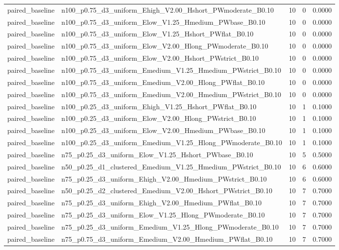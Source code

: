 \begin{tabular}{llrrr}
paired_baseline & n100_p0.75_d3_uniform_Ehigh_V2.00_Hshort_PWmoderate_B0.10 & 10 & 0 & 0.0000 \\
paired_baseline & n100_p0.75_d3_uniform_Elow_V1.25_Hmedium_PWbase_B0.10 & 10 & 0 & 0.0000 \\
paired_baseline & n100_p0.75_d3_uniform_Elow_V1.25_Hshort_PWflat_B0.10 & 10 & 0 & 0.0000 \\
paired_baseline & n100_p0.75_d3_uniform_Elow_V2.00_Hlong_PWmoderate_B0.10 & 10 & 0 & 0.0000 \\
paired_baseline & n100_p0.75_d3_uniform_Elow_V2.00_Hshort_PWstrict_B0.10 & 10 & 0 & 0.0000 \\
paired_baseline & n100_p0.75_d3_uniform_Emedium_V1.25_Hmedium_PWstrict_B0.10 & 10 & 0 & 0.0000 \\
paired_baseline & n100_p0.75_d3_uniform_Emedium_V2.00_Hlong_PWflat_B0.10 & 10 & 0 & 0.0000 \\
paired_baseline & n100_p0.75_d3_uniform_Emedium_V2.00_Hmedium_PWstrict_B0.10 & 10 & 0 & 0.0000 \\
paired_baseline & n100_p0.25_d3_uniform_Ehigh_V1.25_Hshort_PWflat_B0.10 & 10 & 1 & 0.1000 \\
paired_baseline & n100_p0.25_d3_uniform_Elow_V2.00_Hlong_PWstrict_B0.10 & 10 & 1 & 0.1000 \\
paired_baseline & n100_p0.25_d3_uniform_Elow_V2.00_Hmedium_PWbase_B0.10 & 10 & 1 & 0.1000 \\
paired_baseline & n100_p0.25_d3_uniform_Emedium_V1.25_Hlong_PWmoderate_B0.10 & 10 & 1 & 0.1000 \\
paired_baseline & n75_p0.25_d3_uniform_Elow_V1.25_Hshort_PWbase_B0.10 & 10 & 5 & 0.5000 \\
paired_baseline & n50_p0.25_d1_clustered_Emedium_V1.25_Hmedium_PWstrict_B0.10 & 10 & 6 & 0.6000 \\
paired_baseline & n75_p0.25_d3_uniform_Ehigh_V2.00_Hmedium_PWstrict_B0.10 & 10 & 6 & 0.6000 \\
paired_baseline & n50_p0.25_d2_clustered_Emedium_V2.00_Hshort_PWstrict_B0.10 & 10 & 7 & 0.7000 \\
paired_baseline & n75_p0.25_d3_uniform_Ehigh_V2.00_Hmedium_PWflat_B0.10 & 10 & 7 & 0.7000 \\
paired_baseline & n75_p0.25_d3_uniform_Elow_V1.25_Hlong_PWmoderate_B0.10 & 10 & 7 & 0.7000 \\
paired_baseline & n75_p0.25_d3_uniform_Emedium_V1.25_Hlong_PWmoderate_B0.10 & 10 & 7 & 0.7000 \\
paired_baseline & n75_p0.75_d3_uniform_Emedium_V2.00_Hmedium_PWflat_B0.10 & 10 & 7 & 0.7000 \\

\end{tabular}

